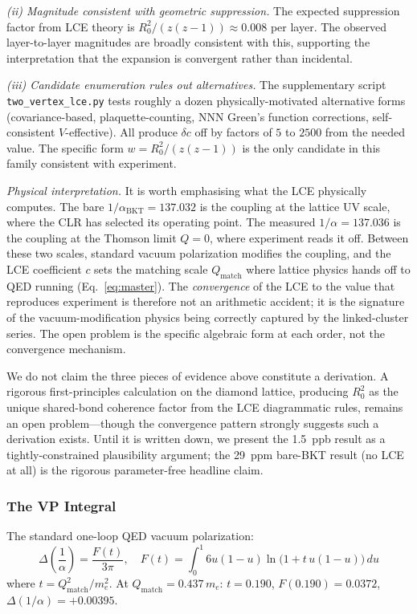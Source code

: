 \documentclass[aps,prd,onecolumn,superscriptaddress,floatfix,12pt]{revtex4-2}
\newcommand{\Rzero}{R_0}
\newcommand{\Qmatch}{Q_{\text{match}}}
\begin{document}
\emph{(ii) Magnitude consistent with geometric suppression.} The expected suppression factor from LCE theory is $\Rzero^2/(z(z-1)) \approx 0.008$ per layer. The observed layer-to-layer magnitudes are broadly consistent with this, supporting the interpretation that the expansion is convergent rather than incidental.

\emph{(iii) Candidate enumeration rules out alternatives.} The supplementary script \texttt{two\_vertex\_lce.py} tests roughly a dozen physically-motivated alternative forms (covariance-based, plaquette-counting, NNN Green's function corrections, self-consistent $V$-effective). All produce $\delta c$ off by factors of $5$ to $2500$ from the needed value. The specific form $w = \Rzero^2/(z(z-1))$ is the only candidate in this family consistent with experiment.

\emph{Physical interpretation.} It is worth emphasising what the LCE physically computes. The bare $1/\alpha_{\text{BKT}} = 137.032$ is the coupling at the lattice UV scale, where the CLR has selected its operating point. The measured $1/\alpha = 137.036$ is the coupling at the Thomson limit $Q = 0$, where experiment reads it off. Between these two scales, standard vacuum polarization modifies the coupling, and the LCE coefficient $c$ sets the matching scale $Q_{\text{match}}$ where lattice physics hands off to QED running (Eq.~\ref{eq:master}). The \emph{convergence} of the LCE to the value that reproduces experiment is therefore not an arithmetic accident; it is the signature of the vacuum-modification physics being correctly captured by the linked-cluster series. The open problem is the specific algebraic form at each order, not the convergence mechanism.

We do not claim the three pieces of evidence above constitute a derivation. A rigorous first-principles calculation on the diamond lattice, producing $\Rzero^2$ as the unique shared-bond coherence factor from the LCE diagrammatic rules, remains an open problem---though the convergence pattern strongly suggests such a derivation exists. Until it is written down, we present the 1.5~ppb result as a tightly-constrained plausibility argument; the 29~ppm bare-BKT result (no LCE at all) is the rigorous parameter-free headline claim.

\subsubsection{The VP Integral}

The standard one-loop QED vacuum polarization:
\begin{equation}\label{eq:vp}
\Delta\!\left(\frac{1}{\alpha}\right) = \frac{F(t)}{3\pi}, \quad F(t) = \int_0^1 6u(1{-}u)\ln\!\bigl(1 + t\,u(1{-}u)\bigr)\,du
\end{equation}
where $t = \Qmatch^2/m_e^2$. At $\Qmatch = 0.437\,m_e$: $t = 0.190$, $F(0.190) = 0.0372$, $\Delta(1/\alpha) = +0.00395$.
\end{document}
